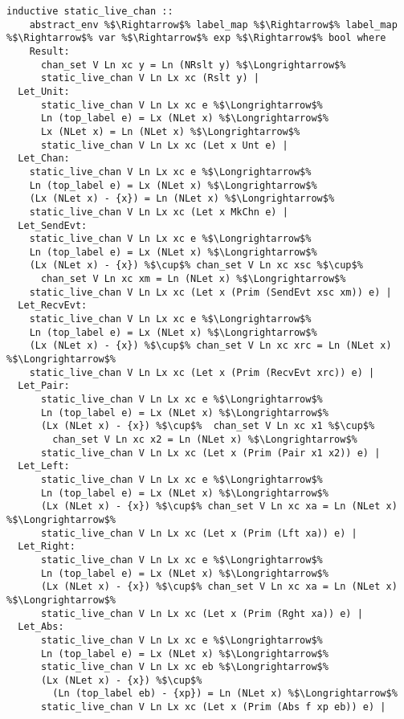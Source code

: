 \documentclass{article}
\begin{document}
\begin{lstlisting}[style=codestyle1, escapechar=\%]
  inductive static_live_chan ::
    abstract_env %$\Rightarrow$% label_map %$\Rightarrow$% label_map %$\Rightarrow$% var %$\Rightarrow$% exp %$\Rightarrow$% bool where
    Result:
      chan_set V Ln xc y = Ln (NRslt y) %$\Longrightarrow$%
      static_live_chan V Ln Lx xc (Rslt y) |
  Let_Unit:
      static_live_chan V Ln Lx xc e %$\Longrightarrow$%
      Ln (top_label e) = Lx (NLet x) %$\Longrightarrow$%
      Lx (NLet x) = Ln (NLet x) %$\Longrightarrow$%
      static_live_chan V Ln Lx xc (Let x Unt e) |
  Let_Chan:
    static_live_chan V Ln Lx xc e %$\Longrightarrow$%
    Ln (top_label e) = Lx (NLet x) %$\Longrightarrow$%
    (Lx (NLet x) - {x}) = Ln (NLet x) %$\Longrightarrow$%
    static_live_chan V Ln Lx xc (Let x MkChn e) |
  Let_SendEvt:
    static_live_chan V Ln Lx xc e %$\Longrightarrow$%
    Ln (top_label e) = Lx (NLet x) %$\Longrightarrow$%
    (Lx (NLet x) - {x}) %$\cup$% chan_set V Ln xc xsc %$\cup$%
      chan_set V Ln xc xm = Ln (NLet x) %$\Longrightarrow$%
    static_live_chan V Ln Lx xc (Let x (Prim (SendEvt xsc xm)) e) |
  Let_RecvEvt:
    static_live_chan V Ln Lx xc e %$\Longrightarrow$%
    Ln (top_label e) = Lx (NLet x) %$\Longrightarrow$%
    (Lx (NLet x) - {x}) %$\cup$% chan_set V Ln xc xrc = Ln (NLet x) %$\Longrightarrow$%
    static_live_chan V Ln Lx xc (Let x (Prim (RecvEvt xrc)) e) |
  Let_Pair:
      static_live_chan V Ln Lx xc e %$\Longrightarrow$%
      Ln (top_label e) = Lx (NLet x) %$\Longrightarrow$%
      (Lx (NLet x) - {x}) %$\cup$%  chan_set V Ln xc x1 %$\cup$%
        chan_set V Ln xc x2 = Ln (NLet x) %$\Longrightarrow$%
      static_live_chan V Ln Lx xc (Let x (Prim (Pair x1 x2)) e) |
  Let_Left:
      static_live_chan V Ln Lx xc e %$\Longrightarrow$%
      Ln (top_label e) = Lx (NLet x) %$\Longrightarrow$%
      (Lx (NLet x) - {x}) %$\cup$% chan_set V Ln xc xa = Ln (NLet x) %$\Longrightarrow$%
      static_live_chan V Ln Lx xc (Let x (Prim (Lft xa)) e) |
  Let_Right:
      static_live_chan V Ln Lx xc e %$\Longrightarrow$%
      Ln (top_label e) = Lx (NLet x) %$\Longrightarrow$%
      (Lx (NLet x) - {x}) %$\cup$% chan_set V Ln xc xa = Ln (NLet x) %$\Longrightarrow$%
      static_live_chan V Ln Lx xc (Let x (Prim (Rght xa)) e) |
  Let_Abs:
      static_live_chan V Ln Lx xc e %$\Longrightarrow$%
      Ln (top_label e) = Lx (NLet x) %$\Longrightarrow$%
      static_live_chan V Ln Lx xc eb %$\Longrightarrow$%
      (Lx (NLet x) - {x}) %$\cup$%
        (Ln (top_label eb) - {xp}) = Ln (NLet x) %$\Longrightarrow$%
      static_live_chan V Ln Lx xc (Let x (Prim (Abs f xp eb)) e) |

\end{lstlisting}
\end{document}
